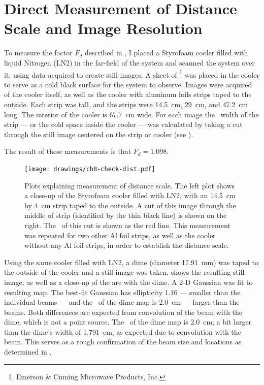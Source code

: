 \section{Direct Measurement of Distance Scale and Image Resolution} \label{sec:ch8-dist-scale}

To measure the factor $F_d$ described in , I placed a Styrofoam cooler filled with liquid Nitrogen (LN2) in the far-field of the system and scanned the system over it, using data acquired to create still images.
A sheet of \ecco\footnote{Emerson \& Cuming Microwave Products, Inc.} was placed in the cooler to serve as a cold black surface for the system to observe.
Images were acquired of the cooler itself, as well as the cooler with aluminum foils strips taped to the outside.
Each strip was  tall, and the strips were \SI{14.5}{\cm}, \SI{29}{\cm}, and \SI{47.2}{\cm} long.
The interior of the cooler is \SI{67.7}{\cm} wide.
For each image the \FWHM\ width of the strip --- or the cold space inside the cooler --- was calculated by taking a cut through the still image centered on the strip or cooler (see ).

The result of these measurements is that $F_d = 1.098$.

\begin{figure}
\centering
\texttt{[image: drawings/ch8-check-dist.pdf]}
\caption[Distance scale measurements]{
  Plots explaining measurement of distance scale.
  The left plot shows a close-up of the Styrofoam cooler filled with LN2, with an \SI{14.5}{\cm} by \SI{4}{\cm} strip taped to the outside.
  A cut of this image through the middle of strip (identified by the thin black line) is shown on the right.
  The \FWHM\ of this cut is shown as the red line.
  This measurement was repeated for two other Al foil strips, as well as the cooler without any Al foil strips, in order to establish the distance scale.
}
\label{fig:ch8-check-dist}
\end{figure}


Using the same cooler filled with LN2, a dime (diameter \SI{17.91}{\mm}) was taped to the outside of the cooler and a still image was taken.
 shows the resulting still image, as well as a close-up of the are with the dime.
A 2-D Gaussian was fit to resulting map.
The best-fit Gaussian has ellipticity 1.16 --- smaller than the individual beams --- and the \FWHM\ of the dime map is \SI{2.0}{\cm} --- larger than the beams.
Both differences are expected from convolution of the beam with the dime, which is not a point source.
The \FWHM\ of the dime map is \SI{2.0}{\cm}; a bit larger than the dime's width of \SI{1.791}{\cm}, as expected due to convolution with the beam.
This serves as a rough confirmation of the beam size and locations as determined in .

